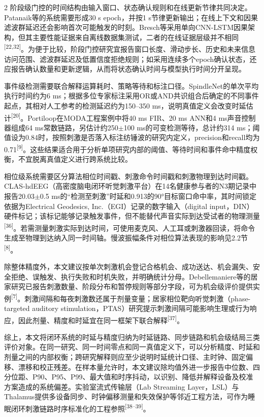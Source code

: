 \documentclass[UTF8,zihao=5,fontset=none]{ctexart}
\newcommand{\refcite}[1]{\nolinebreak[4]\textsuperscript{[#1]}}
\begin{document}
\begin{multicols}{2}
阶段级门控的时间结构由输入窗口、状态确认规则和在线更新节律共同决定。Patanaik等的系统需要形成30 s epoch，并按1 s节律更新输出；在线上下文和因果滤波群延迟还会影响首次可能触发的时刻。Bresch等采用单向CNN-LSTM因果架构，但其主要性能证据来自离线数据集测试，二者的在线证据层级并不相同\refcite{22,32}。为便于比较，阶段门控研究宜报告窗口长度、滑动步长、历史和未来信息访问范围、滤波群延迟及低置信度拒绝规则；如采用连续多个epoch确认状态，还应报告确认数量和更新逻辑，从而将状态确认时间与模型执行时间分开呈现。\par

事件级检测需要联合解释运算耗时、策略等待和标注口径。SpindleNet的单次平均执行时间约为6 ms；根据多位专家标注采用OR或AND共识组合后确定的不同事件起点，其相对人工参考的检测延迟约为150--350 ms，说明真值定义会改变时延估计\refcite{20}。Portiloop在MODA工程案例中将40 ms FIR、20 ms ANN和4 ms声音控制器组成64 ms常数链路，另估计约250$\pm$100 ms的可变检测等待，总计约314 ms；阈值设为0.84时，按照刺激是否落入标注纺锤波的研究内定义，precision和recall均为0.71\refcite{9}。这些结果适合用于分析单项研究内部的阈值、等待时间和事件命中精度权衡，不宜脱离真值定义进行跨系统比较。\par

相位级系统需要区分算法相位时间戳、刺激命令时间戳和刺激物理到达时间戳。CLAS-hdEEG（高密度脑电闭环听觉刺激平台）在14名健康参与者的N3期记录中报告20.03$\pm$0.5 ms的“检测至刺激”时延和0.913的90°目标窗口命中率，其时间锁定依据为Electrical Geodesics, Inc.（EGI）记录的数字输入（digital input，DIN）硬件标记；该标记能够记录触发事件，但不能替代声音实际到达受试者的物理测量\refcite{36}。若需测量刺激实际到达时间，可使用麦克风、人工耳或刺激器回读，将命令生成至物理到达纳入同一时间轴。慢波振幅条件对相位算法表现的影响见2.2节\refcite{8}。\par

除整体精度外，本文建议按单次刺激机会登记合格机会、成功送达、机会漏失、安全拒绝、误触发、执行失败和时机失败，并明确统计分母。Debellemaniere等的居家研究已报告刺激数量、阶段分布和暂停规则等部分字段，可为机会级评价提供实例\refcite{7}。刺激间隔和每夜刺激数还属于剂量变量；居家相位靶向听觉刺激（phase-targeted auditory stimulation，PTAS）研究提示刺激间隔可能影响生理或行为响应，因此剂量、精度和时延宜在同一框架下联合解释\refcite{37}。\par

综上，本文将闭环系统的时延与精度归纳为时延链路、同步链路和机会级结局三类评价对象。在同一研究、同一时间零点和同一真值定义下，可以分析精度、时延和剂量之间的内部权衡；跨研究解释则应至少说明时延统计口径、主时钟、固定偏移、漂移和校正残差。在样本量允许时，本文建议除均值外进一步报告中位数、四分位距、P90、P95、P99、最大值和时序抖动，以识别、降低并解释设备及校准方案造成的系统偏差。实验室流式传输层（Lab Streaming Layer，LSL）与Thalamus提供多设备同步、时钟偏移测量和失效保护等邻近工程方法，可作为睡眠闭环刺激链路时序标准化的工程参照\refcite{38--39}。\par


\end{multicols}
\end{document}
